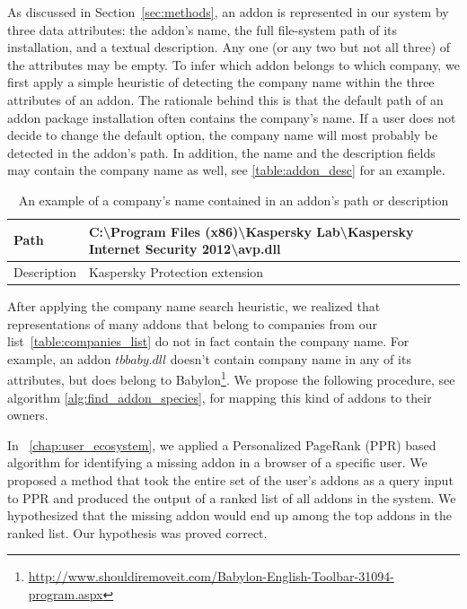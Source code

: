 \documentclass[11pt,oneside]{book}
\begin{document}
As discussed in Section~\ref{sec:methods}, an addon is represented in our system by three data attributes: the addon's name, the full file-system path of its installation, and a textual description. Any one (or any two but not all three) of the attributes may be empty. To infer which addon belongs to which company, we first apply a simple heuristic of detecting the company name within the three attributes of an addon. The rationale behind this is that the default path of an addon package installation often contains the company's name. If a user does not decide to change the default option, the company name will most probably be detected in the addon's path. In addition, the name and the description fields may contain the company name as well, see \autoref{table:addon_desc} for an example.

\begin{table}[!htbp]
\centering
\caption{An example of a company's name contained in an addon's path or description}
\label{table:addon_desc}
\begin{tabular}{@{}|l|l|@{}}
\toprule
Path & C:\textbackslash{Program Files (x86)}\textbackslash{Kaspersky Lab}\textbackslash{Kaspersky Internet Security 2012}\textbackslash{avp.dll} \\ \midrule
Description & Kaspersky Protection extension \\ \bottomrule
\end{tabular}
\end{table}

After applying the company name search heuristic, we realized that representations of many addons that belong to companies from our list~\autoref{table:companies_list} do not in fact contain the company name. For example, an addon $tbbaby.dll$ doesn't contain company name in any of its attributes, but does belong to Babylon\footnote{\url{http://www.shouldiremoveit.com/Babylon-English-Toolbar-31094-program.aspx}}. 
We propose the following procedure, see algorithm \autoref{alg:find_addon_species}, for mapping this kind of addons to their owners. 

In ~\autoref{chap:user_ecosystem}, we applied a Personalized PageRank (PPR) based algorithm for identifying a missing addon in a browser of a specific user. We proposed a method that took the entire set of the user's addons as a query input to PPR and produced the output of a ranked list of all addons in the system. We hypothesized that the missing addon would end up among the top addons in the ranked list. Our hypothesis was proved correct.
\end{document}
